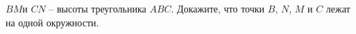 \begin{ex}
	\begin{condition}
		\( BM  \)и \( CN \) – высоты треугольника \( ABC \). Докажите, что точки \( B \), \( N  \), \( M  \) и \( C  \) лежат на одной окружности.
	\end{condition}
\end{ex}